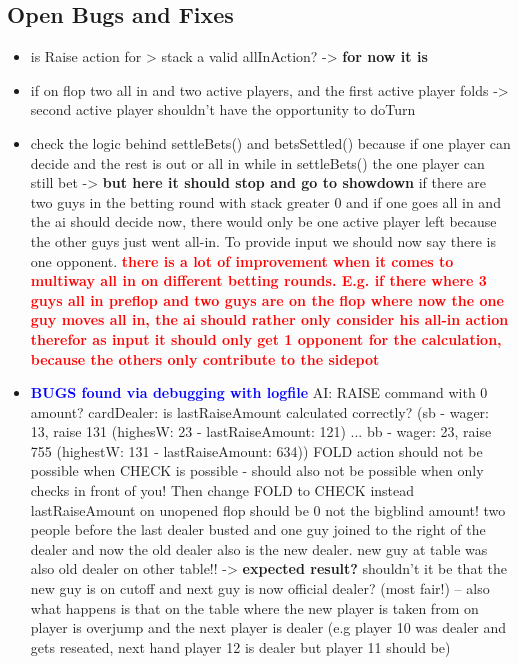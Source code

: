 \subsection{Open Bugs and Fixes}
\begin{itemize}
\item is Raise action for > stack a valid allInAction? -> \textbf{for now it is}
\item if on flop two all in and two active players, and the first active player folds -> second active player shouldn't have the opportunity to doTurn
\item check the logic behind settleBets() and betsSettled() because if one player can decide and the rest is out or all in while in settleBets() the one player can still bet -> \textbf{but here it should stop and go to showdown}
\subitem if there are two guys in the betting round with stack greater 0 and if one goes all in and the ai should decide now, there would only be one active player left because the other guys just went all-in. To provide input we should now say there is one opponent.
\subitem \textbf{\textcolor{red}{there is a lot of improvement when it comes to multiway all in on different betting rounds. E.g. if there where 3 guys all in preflop and two guys are on the flop where now the one guy moves all in, the ai should rather only consider his all-in action therefor as input it should only get 1 opponent for the calculation, because the others only contribute to the sidepot}}
\item \textbf{\textcolor{blue}{BUGS found via debugging with logfile}}
\subitem AI: RAISE command with 0 amount?
\subitem cardDealer: is lastRaiseAmount calculated correctly? (sb - wager: 13, raise 131 (highesW: 23 - lastRaiseAmount: 121) ... bb - wager: 23, raise 755 (highestW: 131 - lastRaiseAmount: 634))
\subitem FOLD action should not be possible when CHECK is possible - should also not be possible when only checks in front of you! Then change FOLD to CHECK instead
\subitem lastRaiseAmount on unopened flop should be 0 not the bigblind amount!
\subitem two people before the last dealer busted and one guy joined to the right of the dealer and now the old dealer also is the new dealer. new guy at table was also old dealer on other table!! -> \textbf{expected result?} shouldn't it be that the new guy is on cutoff and next guy is now official dealer? (most fair!) -- also what happens is that on the table where the new player is taken from on player is overjump and the next player is dealer (e.g player 10 was dealer and gets reseated, next hand player 12 is dealer but player 11 should be)\\\\

\end{itemize}
